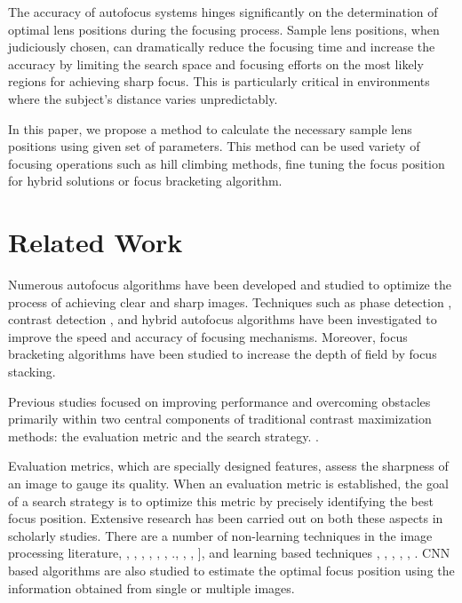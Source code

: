 \documentclass{article}
\begin{document}
The accuracy of autofocus systems hinges significantly on the determination of optimal lens positions during the focusing process. Sample lens positions, when judiciously chosen, can dramatically reduce the focusing time and increase the accuracy by limiting the search space and focusing efforts on the most likely regions for achieving sharp focus. This is particularly critical in environments where the subject's distance varies unpredictably.

In this paper, we propose a method to calculate the necessary sample lens positions using given set of parameters. This method can be used variety of focusing operations such as hill climbing methods, fine tuning the focus position for hybrid solutions or focus bracketing algorithm.



\section{Related Work}
\label{sec:relatedwork}

Numerous autofocus algorithms have been developed and studied to optimize the process of achieving clear and sharp images. Techniques such as phase detection \cite{Chan:ICIP17}, contrast detection \cite{he2003modified}, and hybrid autofocus algorithms \cite{herrmann2020learning} have been investigated to improve the speed and accuracy of focusing mechanisms. Moreover, focus bracketing algorithms \cite{araujo2022focus} have been studied to increase the depth of field by focus stacking. 

Previous studies focused on improving performance and overcoming obstacles primarily within two central components of traditional contrast maximization methods: the evaluation metric and the search strategy. \cite{Yao2006Evaluation} \cite{gamadia2010performance}. 

Evaluation metrics, which are specially designed features, assess the sharpness of an image to gauge its quality. When an evaluation metric is established, the goal of a search strategy is to optimize this metric by precisely identifying the best focus position. Extensive research has been carried out on both these aspects in scholarly studies. There are a number of non-learning techniques in the image processing literature,
\cite{Yao2006Evaluation}, \cite{kehtarnavaz2003development}, \cite{he2003modified}, 
\cite{guo2018fast}, \cite{gamadia2012filter}, \cite{yousefi2011new}, 
\cite{gamadia2010performance}.\cite{Lee2008}, \cite{Lee2009}, \cite{Yang:ICIP16}, \cite{Yang:TIP18}], 
and learning based techniques  
\cite{wang2020intelligent}, \cite{park2008fast}, \cite{chen2010passive}, \cite{han2011novel}, \cite{mir2015autofocus}, \cite{jiang2018transform}. 
CNN based algorithms \cite{Nanda01} \cite{herrmann2020learning} are also studied to estimate the optimal focus position using the information obtained from single or multiple images. 
\end{document}
